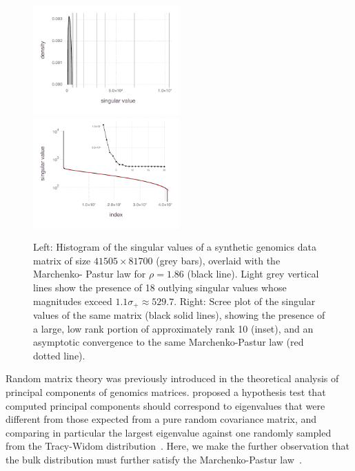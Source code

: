 \documentclass[final,leqno]{siamltex1213}
\begin{document}
\begin{figure}

\includegraphics[width=0.5\textwidth]{fig/synthetic/fig-empirical-density}
%
\includegraphics[width=0.5\textwidth]{fig/synthetic/fig-empirical-scree}

\caption{Left: Histogram of the singular values of a synthetic genomics data
matrix of size $41505\times81700$ (grey bars), overlaid with the Marchenko-
Pastur law for $\rho = 1.86$ (black line). Light grey vertical lines show the
presence of 18 outlying singular values whose magnitudes exceed
$1.1\sigma_+ \approx 529.7$.
Right: Scree plot of the singular values of the same matrix
(black solid lines), showing the presence of a large, low rank portion
of approximately rank 10 (inset), and an asymptotic convergence to the same
Marchenko-Pastur law (red dotted line).}
\label{fig:scree}
\end{figure}

Random matrix theory was previously introduced in the theoretical analysis of
principal components of genomics matrices. \cite{Patterson2006} proposed a
hypothesis test that computed principal components should correspond to eigenvalues
that were different from those expected from a pure random covariance matrix,
and comparing in particular the largest eigenvalue against one randomly sampled
from the Tracy-Widom distribution~\cite{Tracy1993,Tracy1994}.
Here, we make the further observation that the bulk distribution must further satisfy the Marchenko-Pastur law~\cite{Marchenko1967}.
\end{document}
